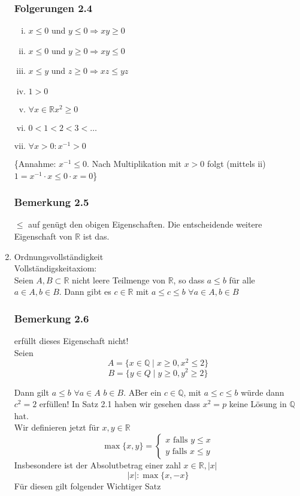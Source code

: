 \begin{enumerate}
\subsubsection*{Folgerungen 2.4}
\begin{enumerate}[i)]
\item $x\leq 0$ und $y\leq 0 \Rightarrow xy\geq 0$
\item $x\leq 0$ und $y\geq 0\Rightarrow xy\leq 0$
\item $x\leq y$ und $z\geq 0\Rightarrow xz\leq yz$
\item $1>0$
\item $\forall x\in\mathbb{R}$\hspace{10mm}$x^2\geq 0$
\item $0<1<2<3<\dots$
\item $\forall x>0: x^{-1}>0$
\end{enumerate}
\{Annahme: $x^{-1}\leq 0$. Nach Multiplikation mit $x>0$ folgt (mittels ii) $1=x^{-1}\cdot x\leq 0\cdot x=0$\}
\subsubsection*{Bemerkung 2.5}
$\leq$ auf  genügt den obigen Eigenschaften. Die entscheidende weitere Eigenschaft von $\mathbb{R}$ ist das.
\item Ordnungsvollständigkeit\\
Vollständigskeitaxiom:\\
Seien $A,B\subset\mathbb{R}$ nicht leere Teilmenge von $\mathbb{R}$, so dass $a\leq b$ für alle $a\in A,b\in B$. Dann gibt es $c\in\mathbb{R}$ mit $a\leq c\leq b$\hspace{5mm} $\forall a\in A,b\in B$
\subsubsection*{Bemerkung 2.6}
 erfüllt dieses Eigenschaft nicht!\\


Seien \[A=\{x\in\mathbb{Q}\mid x\geq 0, x^2\leq 2\}\] \[B=\{y\in Q\mid y\geq 0, y^2 \geq 2\}\] 

Dann gilt $a\leq b$ $\forall a\in A$ $b\in B$. ABer ein $c\in\mathbb{Q}$, mit $a\leq c\leq b$ würde dann $c^2=2$ erfüllen! In Satz 2.1 haben wir gesehen dass $x^2=p$ keine Lösung in $\mathbb{Q}$ hat. \\

Wir definieren jetzt für $x,y\in\mathbb{R}$ \[\max \{ x,y\}  = \left\{ {\begin{array}{*{20}{c}}
{x\text{ falls }y \le x}\\
{y\text{ falls }x \le y}
\end{array}} \right.\] Insbesondere ist der Absolutbetrag einer zahl $x\in\mathbb{R}, \left| x \right|$ \[\left| x \right|:\max \{x,-x\}\] Für diesen gilt folgender Wichtiger Satz

\end{enumerate}
